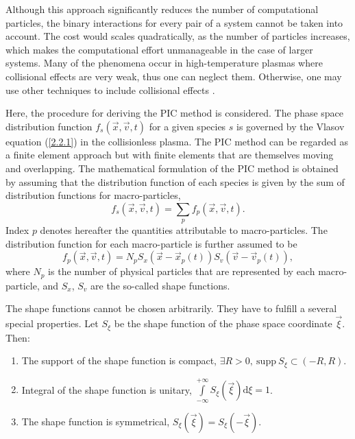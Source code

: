 Although this approach significantly reduces the number of computational particles, the binary interactions for every pair of a system cannot be taken into account. The cost would scales quadratically, as the number of particles increases, which makes the computational effort unmanageable in the case of larger systems. Many of the phenomena occur in high-temperature plasmas where collisional effects are very weak, thus one can neglect them. Otherwise, one may use other techniques to include collisional effects \cite{lapenta}.

Here, the procedure for deriving the PIC method is considered. The phase space distribution function  $ f_{s} \left(\vec{x}, \vec{v}, t\right) $ for a given species $ s $ is governed by the Vlasov equation (\ref{2.2.1}) in the collisionless plasma. The PIC method can be regarded as a finite element approach but with finite elements that are themselves moving and overlapping. The mathematical formulation of the PIC method is obtained by assuming that the distribution function of each species is given by the sum of distribution functions for macro-particles,
\begin{equation}
\label{3.1.1}
f_{s} \left(\vec{x}, \vec{v}, t \right) =  \sum_{p} f_{p}\left(\vec{x}, \vec{v}, t \right).
\end{equation}
Index $ p $ denotes hereafter the quantities attributable to macro-particles. The distribution function for each macro-particle is further assumed to be
\begin{equation}
\label{3.1.2}
f_{p}\left(\vec{x}, \vec{v}, t \right) = N_{p} S_{x}\left(\vec{x} - \vec{x}_{p}\left(t\right) \right)  S_{v}\left(\vec{v} - \vec{v}_{p}\left( t\right) \right),
\end{equation}
where $ N_{p} $ is the number of physical particles that are represented by each macro-particle, and $ S_{x} $, $ S_{v} $ are the so-called shape functions.

The shape functions cannot be chosen arbitrarily. They have to fulfill a several special properties. Let $ S_{\xi} $ be the shape function of the phase space coordinate $ \vec{\xi} $. Then:
\begin{enumerate}[nolistsep, topsep=5pt]
\item The support of the shape function is compact, $ \exists R > 0, \: \mathrm{supp} \: S_{\xi} \subset \left(-R, R\right) $.
\item Integral of the shape function is unitary, $ \int\limits_{-\infty}^{+\infty} S_{\xi}\left(\vec{\xi}\right)  \mathrm{d} \xi = 1 $.
\item The shape function is symmetrical, $ S_{\xi}\left(\vec{\xi}\right) = S_{\xi}\left(-\vec{\xi}\right) $.
\end{enumerate}

